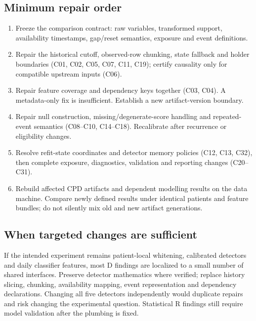 \documentclass[11pt,a4paper]{article}
\begin{document}
\subsection{Minimum repair order}
\begin{enumerate}
\item Freeze the comparison contract: raw variables, transformed support, availability
timestamps, gap/reset semantics, exposure and event definitions.
\item Repair the historical cutoff, observed-row chunking, state fallback and holder
boundaries (C01, C02, C05, C07, C11, C19); certify causality only for compatible
upstream inputs (C06).
\item Repair feature coverage and dependency keys together (C03, C04). A metadata-only
fix is insufficient. Establish a new artifact-version boundary.
\item Repair null construction, missing/degenerate-score handling and repeated-event
semantics (C08--C10, C14--C18). Recalibrate after recurrence or eligibility changes.
\item Resolve refit-state coordinates and detector memory policies (C12, C13, C32), then
complete exposure, diagnostics, validation and reporting changes (C20--C31).
\item Rebuild affected CPD artifacts and dependent modelling results on the data
machine. Compare newly defined results under identical patients and feature bundles;
do not silently mix old and new artifact generations.
\end{enumerate}

\subsection{When targeted changes are sufficient}
If the intended experiment remains patient-local whitening, calibrated detectors and
daily classifier features, most D findings are localized to a small number of shared
interfaces. Preserve detector mathematics where verified; replace history slicing,
chunking, availability mapping, event representation and dependency declarations.
Changing all five detectors independently would duplicate repairs and risk changing
the experimental question. Statistical R findings still require model validation
after the plumbing is fixed.
\end{document}
